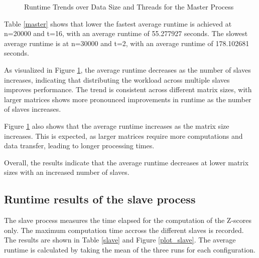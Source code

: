 \documentclass[journal]{./IEEE/IEEEtran}
\begin{document}
\begin{figure}
    \centering
    \caption{Runtime Trends over Data Size and Threads for the Master Process}
    \label{plot_master}
\end{figure}

Table \ref{master} shows that lower the fastest average runtime is achieved at n=20000 and t=16, with an average runtime of 55.277927 seconds. The slowest average runtime is at n=30000 and t=2, with an average runtime of 178.102681 seconds.

As visualized in Figure \ref{plot_master}, the average runtime decreases as the number of slaves increases, indicating that distributing the workload across multiple slaves improves performance. The trend is consistent across different matrix sizes, with larger matrices shows more pronounced improvements in runtime as the number of slaves increases. 

Figure \ref{plot_master} also shows that the average runtime increases as the matrix size increases. This is expected, as larger matrices require more computations and data transfer, leading to longer processing times.

Overall, the results indicate that the average runtime decreases at lower matrix sizes with an increased number of slaves.

\subsection{Runtime results of the slave process}
The slave process measures the time elapsed for the computation of the Z-scores only. The maximum computation time accross the different slaves is recorded. The results are shown in Table \ref{slave} and Figure \ref{plot_slave}. The average runtime is calculated by taking the mean of the three runs for each configuration.
\end{document}
